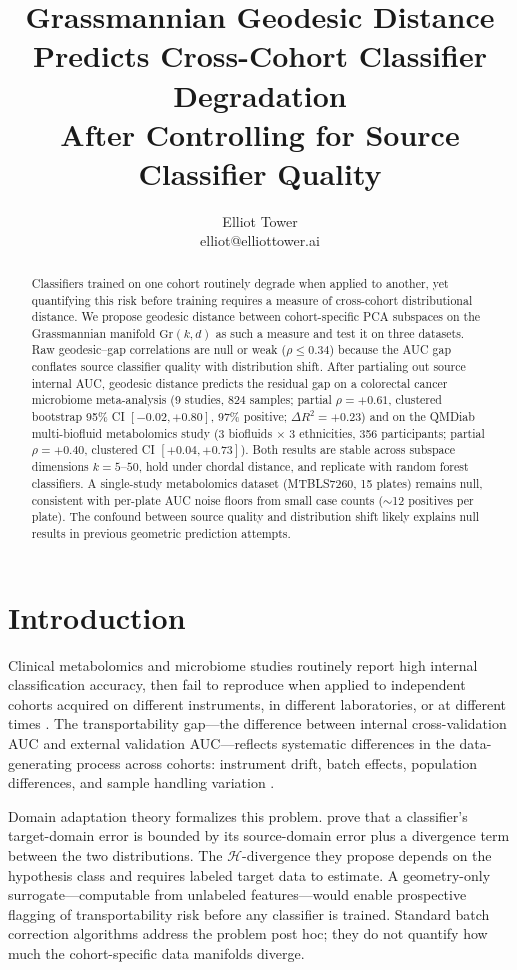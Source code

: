 \documentclass{article}
\title{Grassmannian Geodesic Distance Predicts Cross-Cohort Classifier Degradation\\After Controlling for Source Classifier Quality}
\author{\name Elliot Tower \\
      \email elliot@elliottower.ai}
\begin{document}
\maketitle

\begin{abstract}
Classifiers trained on one cohort routinely degrade when applied to another, yet quantifying this risk before training requires a measure of cross-cohort distributional distance. We propose geodesic distance between cohort-specific PCA subspaces on the Grassmannian manifold $\mathrm{Gr}(k, d)$ as such a measure and test it on three datasets. Raw geodesic--gap correlations are null or weak ($\rho \leq 0.34$) because the AUC gap conflates source classifier quality with distribution shift. After partialing out source internal AUC, geodesic distance predicts the residual gap on a colorectal cancer microbiome meta-analysis (9 studies, 824 samples; partial $\rho = +0.61$, clustered bootstrap 95\% CI $[-0.02, +0.80]$, 97\% positive; $\Delta R^2 = +0.23$) and on the QMDiab multi-biofluid metabolomics study (3 biofluids $\times$ 3 ethnicities, 356 participants; partial $\rho = +0.40$, clustered CI $[+0.04, +0.73]$). Both results are stable across subspace dimensions $k = 5$--$50$, hold under chordal distance, and replicate with random forest classifiers. A single-study metabolomics dataset (MTBLS7260, 15 plates) remains null, consistent with per-plate AUC noise floors from small case counts ($\sim$12 positives per plate). The confound between source quality and distribution shift likely explains null results in previous geometric prediction attempts.
\end{abstract}

\section{Introduction}

Clinical metabolomics and microbiome studies routinely report high internal classification accuracy, then fail to reproduce when applied to independent cohorts acquired on different instruments, in different laboratories, or at different times \citep{broadhurst2006statistical}. The transportability gap---the difference between internal cross-validation AUC and external validation AUC---reflects systematic differences in the data-generating process across cohorts: instrument drift, batch effects, population differences, and sample handling variation \citep{wehrens2016improved}.

Domain adaptation theory formalizes this problem. \citet{bendavid2010theory} prove that a classifier's target-domain error is bounded by its source-domain error plus a divergence term between the two distributions. The $\mathcal{H}$-divergence they propose depends on the hypothesis class and requires labeled target data to estimate. A geometry-only surrogate---computable from unlabeled features---would enable prospective flagging of transportability risk before any classifier is trained. Standard batch correction algorithms \citep{johnson2007adjusting} address the problem post hoc; they do not quantify how much the cohort-specific data manifolds diverge.
\end{document}
